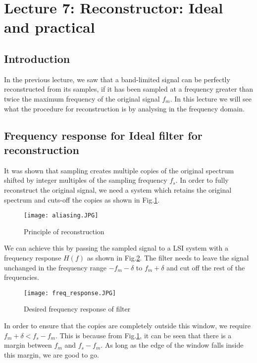 \section{Lecture 7: Reconstructor: Ideal and practical}


\subsection{Introduction}
In the previous lecture, we saw that a band-limited signal can be perfectly reconstructed from its samples, if it has been sampled at a frequency greater than twice the maximum frequency of the original signal $f_{m}$. In this lecture we will see what the procedure for reconstruction is by analysing in the frequency domain. 


\subsection{Frequency response for Ideal filter for reconstruction}
It was shown that sampling creates multiple copies of the original spectrum shifted by integer multiples of the sampling frequency $f_{s}$. In order to fully reconstruct the original signal, we need a system which retains the original spectrum and cuts-off the copies as shown in Fig.\ref{copies}.

\begin{figure}[h] 
        \centering
                \texttt{[image: aliasing.JPG]}
                \caption{Principle of reconstruction}
                \label{copies}
\end{figure}

We can achieve this by passing the sampled signal to a LSI system with a frequency response $H(f)$ as shown in Fig.\ref{freq_response}. The filter needs to leave the signal unchanged in the frequency range $-f_{m} - \delta$ to $f_{m} + \delta$ and cut off the rest of the frequencies. 
\begin{figure}[h] 
        \centering
                \texttt{[image: freq\_response.JPG]}
                \caption{Desired frequency response of filter}
                \label{freq_response}
\end{figure}
In order to ensure that the copies are completely outside this window, we require $f_{m} + \delta < f_{s} - f_{m}$. This is because from Fig.\ref{copies}, it can be seen that there is a margin between $f_{m}$ and $f_{s} - f_{m}$. As long as the edge of the window falls inside this margin, we are good to go. 

